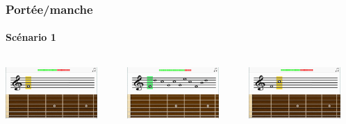 \documentclass{beamer}
\begin{document}
	\begin{frame}

   		\frametitle{Portée/manche}

       		\framesubtitle{Scénario 1}

	\begin{columns}

	 	\begin{column}{0.33\textwidth}

		\includegraphics[width=3.5cm]{images/portee_question.png}

		\end{column}

	 \begin{column}{0.33\textwidth}

		\includegraphics[width=3.5cm]{images/portee_bonne.png}

	\end{column}

	 \begin{column}{0.33\textwidth}

		\includegraphics[width=3.5cm]{images/portee_question_2.png}

	\end{column}

	\end{columns} 

	\end{frame}
 


\end{document}
